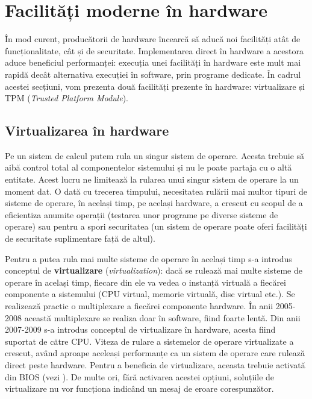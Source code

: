 \section{Facilități moderne în hardware}
\label{sec:hw:features}

În mod curent, producătorii de hardware încearcă să aducă noi facilități atât de funcționalitate, cât și de securitate.
Implementarea direct în hardware a acestora aduce beneficiul performanței: execuția unei facilități în hardware este mult mai rapidă decât alternativa execuției în software, prin programe dedicate.
În cadrul acestei secțiuni, vom prezenta două facilități prezente în hardware: virtualizare și TPM  (\textit{Trusted Platform Module}).

\subsection{Virtualizarea în hardware}
\label{sec:hw:features:virt}

Pe un sistem de calcul putem rula un singur sistem de operare.
Acesta trebuie să aibă control total al componentelor sistemului și nu le poate partaja cu o altă entitate.
Acest lucru ne limitează la rularea unui singur sistem de operare la un moment dat.
O dată cu trecerea timpului, necesitatea rulării mai multor tipuri de sisteme de operare, în același timp, pe același hardware, a crescut cu scopul de a eficientiza anumite operații (testarea unor programe pe diverse sisteme de operare) sau pentru a spori securitatea (un sistem de operare poate oferi facilități de securitate suplimentare față de altul).

Pentru a putea rula mai multe sisteme de operare în același timp s-a introdus conceptul de \textbf{virtualizare} (\textit{virtualization}): dacă se rulează mai multe sisteme de operare în același timp, fiecare din ele va vedea o instanță virtuală a fiecărei componente a sistemului (CPU virtual, memorie virtuală, disc virtual etc.).
Se realizează practic o multiplexare a fiecărei componente hardware.
În anii 2005-2008 această multiplexare se realiza doar în software, fiind foarte lentă.
 Din anii 2007-2009 s-a introdus conceptul de virtualizare în hardware, acesta fiind suportat de către CPU.
Viteza de rulare a sistemelor de operare virtualizate a crescut, având aproape aceleași performanțe ca un sistem de operare care rulează direct peste hardware.
Pentru a beneficia de virtualizare, aceasta trebuie activată din BIOS (vezi ).
 De multe ori, fără activarea acestei opțiuni, soluțiile de virtualizare nu vor funcționa indicând un mesaj de eroare corespunzător.


